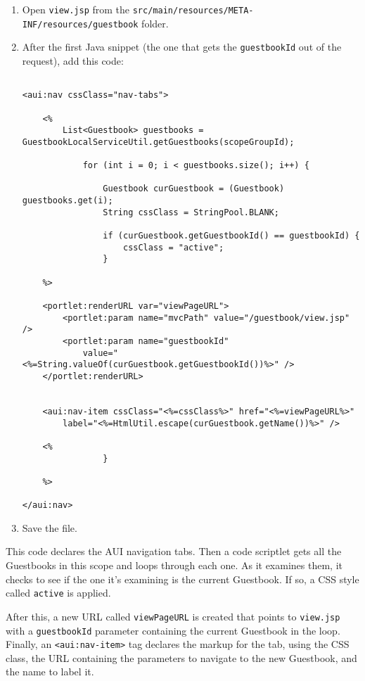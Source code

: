 \begin{enumerate}
\def\labelenumi{\arabic{enumi}.}
\item
  Open \texttt{view.jsp} from the
  \texttt{src/main/resources/META-INF/resources/guestbook} folder.
\item
  After the first Java snippet (the one that gets the
  \texttt{guestbookId} out of the request), add this code:

\begin{verbatim}

<aui:nav cssClass="nav-tabs">

    <%
        List<Guestbook> guestbooks = GuestbookLocalServiceUtil.getGuestbooks(scopeGroupId);

            for (int i = 0; i < guestbooks.size(); i++) {

                Guestbook curGuestbook = (Guestbook) guestbooks.get(i);
                String cssClass = StringPool.BLANK;

                if (curGuestbook.getGuestbookId() == guestbookId) {
                    cssClass = "active";
                }

    %>

    <portlet:renderURL var="viewPageURL">
        <portlet:param name="mvcPath" value="/guestbook/view.jsp" />
        <portlet:param name="guestbookId"
            value="<%=String.valueOf(curGuestbook.getGuestbookId())%>" />
    </portlet:renderURL>


    <aui:nav-item cssClass="<%=cssClass%>" href="<%=viewPageURL%>"
        label="<%=HtmlUtil.escape(curGuestbook.getName())%>" />

    <%  
                }

    %>

</aui:nav>
\end{verbatim}
\item
  Save the file.
\end{enumerate}

This code declares the AUI navigation tabs. Then a code scriptlet gets
all the Guestbooks in this scope and loops through each one. As it
examines them, it checks to see if the one it's examining is the current
Guestbook. If so, a CSS style called \texttt{active} is applied.

After this, a new URL called \texttt{viewPageURL} is created that points
to \texttt{view.jsp} with a \texttt{guestbookId} parameter containing
the current Guestbook in the loop. Finally, an
\texttt{\textless{}aui:nav-item\textgreater{}} tag declares the markup
for the tab, using the CSS class, the URL containing the parameters to
navigate to the new Guestbook, and the name to label it.

